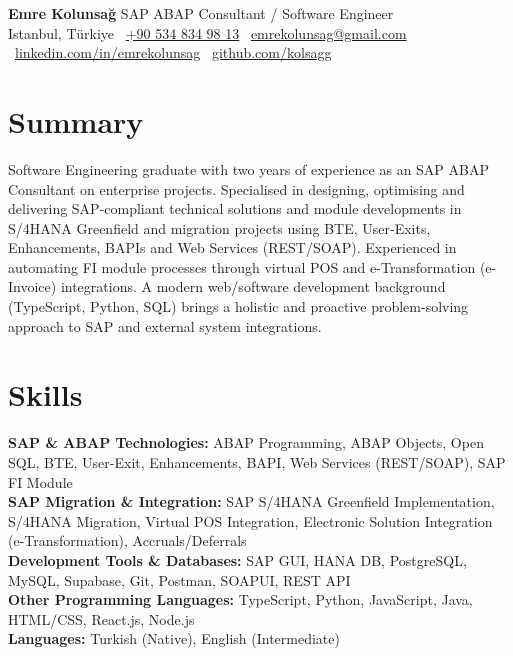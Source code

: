 \documentclass[10pt,a4paper]{extarticle}
\begin{document}
\begin{center}
    \begin{minipage}{\textwidth}
        \centering
        {\LARGE\textbf{Emre Kolunsağ}} \hspace{2pt} {\LARGE{SAP ABAP Consultant / Software Engineer}}\\[10pt]
        Istanbul, Türkiye \textbullet\
        \href{tel:+905348349813}{+90 534 834 98 13} \textbullet\
        \href{mailto:emrekolunsag@gmail.com}{emrekolunsag@gmail.com} \textbullet\
        \href{https://linkedin.com/in/emrekolunsag}{linkedin.com/in/emrekolunsag} \textbullet\
        \href{https://github.com/kolsagg}{github.com/kolsagg}
    \end{minipage}
\end{center}
\section{Summary}
Software Engineering graduate with two years of experience as an SAP ABAP Consultant on enterprise projects.
Specialised in designing, optimising and delivering SAP-compliant technical solutions and module developments
in S/4HANA Greenfield and migration projects using BTE, User-Exits, Enhancements, BAPIs and Web Services
(REST/SOAP). Experienced in automating FI module processes through virtual POS and e-Transformation
(e-Invoice) integrations. A modern web/software development background (TypeScript, Python, SQL) brings a
holistic and proactive problem-solving approach to SAP and external system integrations.
\section{Skills}
\textbf{SAP \& ABAP Technologies:} ABAP Programming, ABAP Objects, Open SQL, BTE, User-Exit, Enhancements, BAPI, Web Services (REST/SOAP), SAP FI Module\\
\textbf{SAP Migration \& Integration:} SAP S/4HANA Greenfield Implementation, S/4HANA Migration, Virtual POS Integration, Electronic Solution Integration (e-Transformation), Accruals/Deferrals\\
\textbf{Development Tools \& Databases:} SAP GUI, HANA DB, PostgreSQL, MySQL, Supabase, Git, Postman, SOAPUI, REST API\\
\textbf{Other Programming Languages:} TypeScript, Python, JavaScript, Java, HTML/CSS, React.js, Node.js\\
\textbf{Languages:} Turkish (Native), English (Intermediate)
\end{document}
